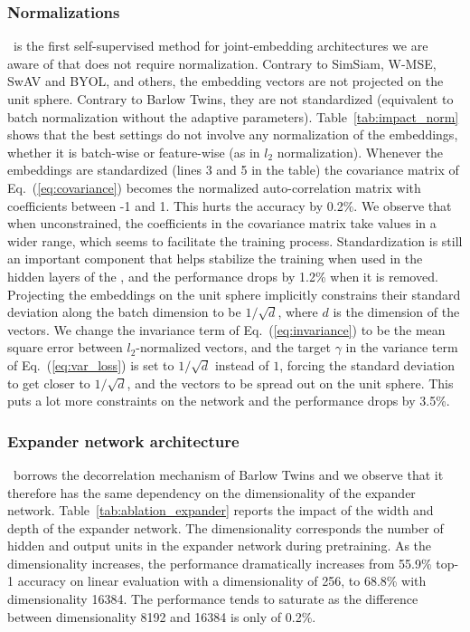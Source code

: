\subsubsection{Normalizations} 
\algo \ is the first self-supervised method for joint-embedding architectures we are aware of that does not require normalization. Contrary to SimSiam, W-MSE, SwAV and BYOL, and others, the embedding vectors are not projected on the unit sphere. Contrary to Barlow Twins, they are not standardized (equivalent to batch normalization without the adaptive parameters). Table~\ref{tab:impact_norm} shows that the best settings do not involve any normalization of the embeddings, whether it is batch-wise or feature-wise (as in  $l_2$ normalization). Whenever the embeddings are standardized (lines 3 and 5 in the table) the covariance matrix of Eq.~(\ref{eq:covariance}) becomes the normalized auto-correlation matrix with coefficients between -1 and 1. This hurts the accuracy by 0.2$\%$. We observe that when unconstrained, the coefficients in the covariance matrix take values in a wider range, which seems to facilitate the training process. Standardization is still an important component that helps stabilize the training when used in the hidden layers of the \expandernospace, and the performance drops by 1.2\% when it is removed. Projecting the embeddings on the unit sphere implicitly constrains their standard deviation along the batch dimension to be $1/\sqrt{d}$, where $d$ is the dimension of the vectors. We change the invariance term of Eq.~(\ref{eq:invariance}) to be the mean square error between $l_2$-normalized vectors, and the target $\gamma$ in the variance term of Eq.~(\ref{eq:var_loss}) is set to $1/\sqrt{d}$ instead of $1$, forcing the standard deviation to get closer to $1/\sqrt{d}$, and the vectors to be spread out on the unit sphere. This puts a lot more constraints on the network and the performance drops by 3.5\%.

\subsubsection{Expander network architecture} \label{app:expander_archi}
\algo \ borrows the decorrelation mechanism of Barlow Twins \cite{zbontar2021barlow} and we observe that it therefore has the same dependency on the dimensionality of the expander network. Table~\ref{tab:ablation_expander} reports the impact of the width and depth of the expander network. The dimensionality corresponds the number of hidden and output units in the expander network during pretraining. As the dimensionality increases, the performance dramatically increases from 55.9\% top-1 accuracy on linear evaluation with a dimensionality of 256, to 68.8\% with dimensionality 16384. The performance tends to saturate as the difference between dimensionality 8192 and 16384 is only of 0.2\%.

